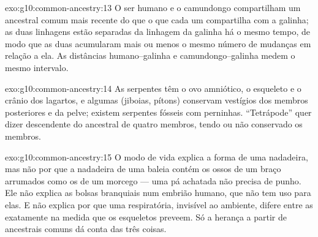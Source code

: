 \begin{solution}{exo:g10:common-ancestry:13}
O ser humano e o camundongo compartilham um ancestral comum mais
recente do que o que cada um compartilha com a galinha; as duas
linhagens estão separadas da linhagem da galinha há o mesmo tempo, de
modo que as duas acumularam mais ou menos o mesmo número de mudanças em
relação a ela. As distâncias humano--galinha e camundongo--galinha
medem o mesmo intervalo.
\end{solution}

\begin{solution}{exo:g10:common-ancestry:14}
As serpentes têm o ovo amniótico, o esqueleto e o crânio dos lagartos,
e algumas (jiboias, pítons) conservam vestígios dos membros posteriores
e da pelve; existem serpentes fósseis com perninhas. ``Tetrápode''
quer dizer descendente do ancestral de quatro membros, tendo ou não
conservado os membros.
\end{solution}

\begin{solution}{exo:g10:common-ancestry:15}
O modo de vida explica a forma de uma nadadeira, mas não por que a
nadadeira de uma baleia contém os ossos de um braço arrumados como os
de um morcego --- uma pá achatada não precisa de punho. Ele não explica
as bolsas branquiais num embrião humano, que não tem uso para elas. E
não explica por que uma  respiratória, invisível ao ambiente,
difere entre as  exatamente na medida que os esqueletos
preveem. Só a herança a partir de ancestrais comuns dá conta das três
coisas.
\end{solution}

